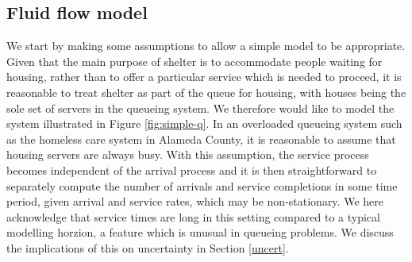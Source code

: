 \documentclass[12pt,a4paper]{article}
\begin{document}
\subsection{Fluid flow model} \label{fluid-model}
%
We start by making some assumptions to allow a simple model to be appropriate. Given that the main purpose of shelter is to accommodate people waiting for housing, rather than to offer a particular service which is needed to proceed, it is reasonable to treat shelter as part of the queue for housing, with houses being the sole set of servers in the queueing system. We therefore would like to model the system illustrated in Figure \ref{fig:simple-q}. In an overloaded queueing system such as the homeless care system in Alameda County, it is reasonable to assume that housing servers are always busy. With this assumption, the service process becomes independent of the arrival process and it is then straightforward to separately compute the number of arrivals and service completions in some time period, given arrival and service rates, which may be non-stationary. We here acknowledge that service times are long in this setting compared to a typical modelling horzion, a feature which is unusual in queueing problems. We discuss the implications of this on uncertainty in Section \ref{uncert}.
\end{document}
